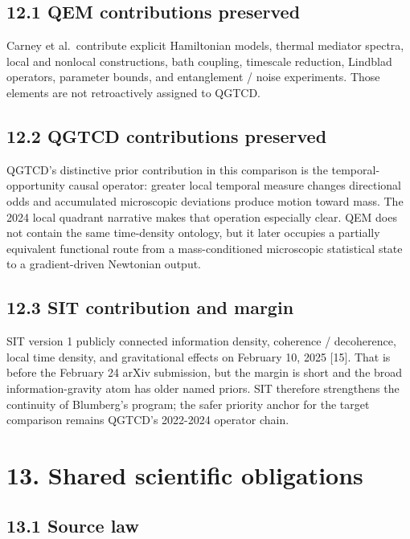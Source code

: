 \documentclass[
  american,
  11pt,
  letterpaper,
]{article}
\begin{document}
\subsection{12.1 QEM contributions preserved}\label{qem-contributions-preserved}

Carney et al.~contribute explicit Hamiltonian models, thermal mediator spectra, local and nonlocal constructions, bath coupling, timescale reduction, Lindblad operators, parameter bounds, and entanglement / noise experiments. Those elements are not retroactively assigned to QGTCD.

\subsection{12.2 QGTCD contributions preserved}\label{qgtcd-contributions-preserved}

QGTCD's distinctive prior contribution in this comparison is the temporal-opportunity causal operator: greater local temporal measure changes directional odds and accumulated microscopic deviations produce motion toward mass. The 2024 local quadrant narrative makes that operation especially clear. QEM does not contain the same time-density ontology, but it later occupies a partially equivalent functional route from a mass-conditioned microscopic statistical state to a gradient-driven Newtonian output.

\subsection{12.3 SIT contribution and margin}\label{sit-contribution-and-margin}

SIT version 1 publicly connected information density, coherence / decoherence, local time density, and gravitational effects on February 10, 2025 {[}15{]}. That is before the February 24 arXiv submission, but the margin is short and the broad information-gravity atom has older named priors. SIT therefore strengthens the continuity of Blumberg's program; the safer priority anchor for the target comparison remains QGTCD's 2022-2024 operator chain.

\section{13. Shared scientific obligations}\label{shared-scientific-obligations}

\subsection{13.1 Source law}\label{source-law}
\end{document}
